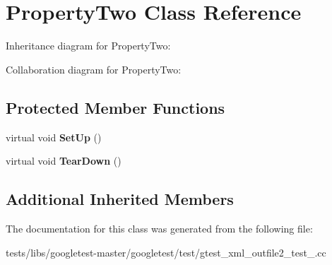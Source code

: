 \hypertarget{classPropertyTwo}{}\section{Property\+Two Class Reference}
\label{classPropertyTwo}


Inheritance diagram for Property\+Two\+:


Collaboration diagram for Property\+Two\+:
\subsection*{Protected Member Functions}
\begin{DoxyCompactItemize}
\item 
\mbox{\label{classPropertyTwo_aa3ab39cf4e6c751cb0788c575bf92ca2}} 
virtual void {\bfseries Set\+Up} ()
\item 
\mbox{\label{classPropertyTwo_aa4ffb2b9dddeba69f0f9baf133f06ef2}} 
virtual void {\bfseries Tear\+Down} ()
\end{DoxyCompactItemize}
\subsection*{Additional Inherited Members}


The documentation for this class was generated from the following file\+:\begin{DoxyCompactItemize}
\item 
tests/libs/googletest-\/master/googletest/test/gtest\+\_\+xml\+\_\+outfile2\+\_\+test\+\_\+.\+cc\end{DoxyCompactItemize}
